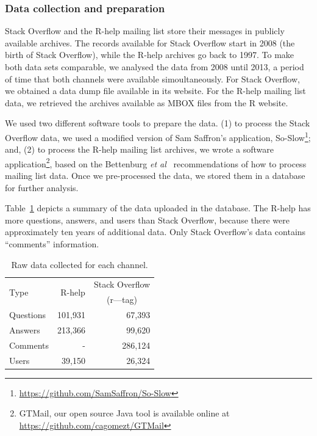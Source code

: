\documentclass{sig-alternate-05-2015}
\begin{document}
\subsubsection{Data collection and preparation}
\label{subsec:preparation}

	Stack Overflow and the R-help mailing list store their messages in publicly available archives.
	The records available for Stack Overflow start in 2008 (the birth of Stack Overflow), while the R-help archives go back to 1997.
	To make both data sets comparable, we analysed the data from 2008 until 2013, a period of time that both channels were available simoultaneously.
For Stack Overflow, we obtained a data dump file available in its website.
For the R-help mailing list data, we retrieved the archives available as MBOX files from the R website.

	We used two different software tools to prepare the data.
	(1) to process the Stack Overflow data, we used a modified version of Sam Saffron's application, So-Slow\footnote{\url{https://github.com/SamSaffron/So-Slow}}; and,
	(2) to process the R-help mailing list archives, we wrote a software application\footnote{GTMail, our open source Java tool is available online at \url{https://github.com/cagomezt/GTMail}}, based on the Bettenburg \textit{et al}~\cite{Bettenburg2009} recommendations of how to process mailing list data.
    Once we pre-processed the data, we stored them in a database for further analysis.

	Table~\ref{table:data} depicts a summary of the data uploaded in the database.
	The R-help has more questions, answers, and users than Stack Overflow, because there were approximately ten years of additional data.
	Only Stack Overflow's data contains ``comments'' information. %

	\begin{table}[!htb]
		\caption{Raw data collected for each channel.}
		\begin{center}
			\begin{tabular}{lrr}
				\toprule
				\multirow{2}{*}{Type} & \multirow{2}{*}{R-help} & Stack Overflow \\
				                      &                         & \multicolumn{1}{c}{(r---tag)}\\
				\midrule
				Questions     & 101,931 &  67,393 \\
				Answers       & 213,366 &  99,620 \\
				Comments      &       - & 286,124 \\
				Users         &  39,150 &  26,324 \\
				\bottomrule
			\end{tabular} 
		\end{center}
		\label{table:data}
	\end{table}
\end{document}
